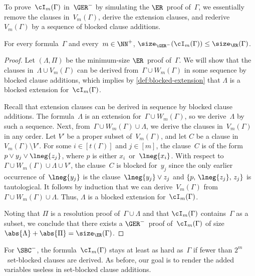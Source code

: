 \documentclass[10pt,a4paper]{article}
\begin{document}
To prove~$\cI_m(\Gamma)$ in~$\GER^-$ by simulating the $\ER$~proof of~$\Gamma$,
we essentially remove the clauses in~$V_m(\Gamma)$,
derive the extension clauses, and rederive~$V_m(\Gamma)$
by a sequence of blocked clause additions.

\begin{lemma}\label{thm:guarding-blocked-pair-easy-for-GER}
  For every formula~$\Gamma$ and every~$m \in \NN^+$,
  $\size_{\GER^-}(\cI_m(\Gamma)) \leq \size_{\ER}(\Gamma)$.
\end{lemma}
\begin{proof}
  Let $(\Lambda, \Pi)$ be the minimum-size $\ER$~proof of~$\Gamma$.
  We will show that the clauses in~$\Lambda \cup V_m(\Gamma)$
  can be derived from~$\Gamma \cup W_m(\Gamma)$
  in some sequence by blocked clause additions,
  which implies by \cref{def:blocked-extension}
  that $\Lambda$ is a blocked extension for~$\cI_m(\Gamma)$.

  Recall that extension clauses can be derived in sequence
  by blocked clause additions.
  The formula~$\Lambda$ is an extension for~$\Gamma \cup W_m(\Gamma)$,
  so we derive~$\Lambda$ by such a sequence.
  Next, from~$\Gamma \cup W_m(\Gamma) \cup \Lambda$,
  we derive the clauses in~$V_m(\Gamma)$ in any order.
  Let $V'$ be a proper subset of~$V_m(\Gamma)$,
  and let $C$ be a clause in~$V_m(\Gamma) \setminus V'$.
  For some $i \in [t(\Gamma)]$ and $j \in [m]$,
  the clause~$C$ is of the form~$p \lor y_j \lor \lneg{z_j}$,
  where $p$ is either $x_i$~or~$\lneg{x_i}$.
  With respect to~$\Gamma \cup W_m(\Gamma) \cup \Lambda \cup V'$,
  the clause~$C$ is blocked for~$y_j$
  since the only earlier occurrence of~$\lneg{y_j}$
  is the clause~$\lneg{y_j} \lor z_j$
  and $\{p,\, \lneg{z_j},\, z_j\}$ is tautological.
  It follows by induction that we can derive~$V_m(\Gamma)$
  from~$\Gamma \cup W_m(\Gamma) \cup \Lambda$.
  Thus, $\Lambda$ is a blocked extension for~$\cI_m(\Gamma)$.

  Noting that $\Pi$ is a resolution proof of~$\Gamma \cup \Lambda$
  and that $\cI_m(\Gamma)$ contains~$\Gamma$ as a subset,
  we conclude that there exists a $\GER^-$~proof of~$\cI_m(\Gamma)$
  of size~$\abs{\Lambda} + \abs{\Pi} = \size_\ER(\Gamma)$.
\end{proof}

For $\SBC^-$, the formula~$\cI_m(\Gamma)$
stays at least as hard as~$\Gamma$
if fewer than $2^m$~set-blocked clauses are derived.
As before, our goal is to render the added variables
useless in set-blocked clause additions.
\end{document}
